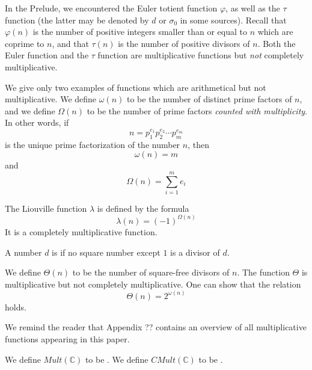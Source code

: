 \begin{example}
In the Prelude, we encountered the Euler totient function $\varphi$, as well as the $\tau$ function (the latter may be denoted by $d$ or $\sigma_0$ in some sources). Recall that $\varphi(n)$ is the number of positive integers smaller than or equal to $n$ which are coprime to $n$, and that $\tau(n)$ is the number of positive divisors of $n$. Both the Euler function and the $\tau$ function are multiplicative functions but \emph{not} completely multiplicative.
\end{example}

\begin{definition}
We give only two examples of functions which are arithmetical but not multiplicative. We define $\omega(n)$ to be the number of distinct prime factors of $n$, and we define $\Omega(n)$ to be the number of prime factors \emph{counted with multiplicity}. In other words, if
$$ n = p_1 ^{e_1} p_2^{e_2} \cdots p_m^{e_m}  $$
is the unique prime factorization of the number $n$, then
$$ \omega(n) = m    $$
and
$$  \Omega(n) = \sum_{i=1}^m  e_i $$
\end{definition}

\begin{example}
The Liouville function $\lambda$ is defined by the formula
$$ \lambda(n) = (-1)^{\Omega(n)}  $$
It is a completely multiplicative function.
\end{example}

\begin{definition}
A number $d$ is  if no square number except $1$ is a divisor of $d$.
\end{definition}

\begin{example}
We define $\Theta(n)$ to be the number of square-free divisors of $n$. The function $\Theta$ is multiplicative but not completely multiplicative. One can show that the relation
$$ \Theta(n) = 2^{\omega(n)}   $$
holds.
\end{example}

We remind the reader that Appendix ?? contains an overview of all multiplicative functions appearing in this paper.

\begin{definition}
We define $Mult(\mathbb{C})$ to be . We define $CMult(\mathbb{C})$ to be .
\end{definition}


